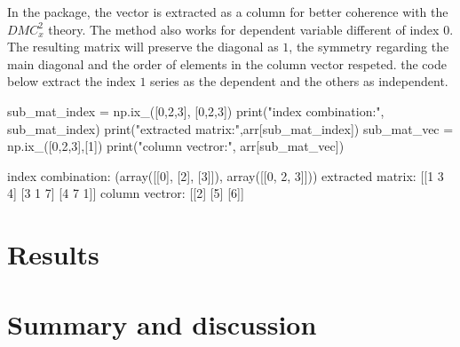 \documentclass[article]{jss}
\begin{document}
In the  package, the vector is extracted as a column for better coherence with the $DMC_{x}^{2}$ theory. The method also works for dependent variable different of index $0$. The resulting matrix will preserve the diagonal as $1$, the symmetry regarding the main diagonal and the order of elements in the column vector respeted. the code below extract the index $1$ series as the dependent and the others as independent.
\begin{CodeChunk}
\begin{CodeInput}
sub_mat_index = np.ix_([0,2,3], [0,2,3])
print("index combination:\n", sub_mat_index)
print("extracted matrix:\n",arr[sub_mat_index])
sub_mat_vec = np.ix_([0,2,3],[1])
print("column vectror:\n", arr[sub_mat_vec])
\end{CodeInput}

\begin{CodeOutput}
index combination:
(array([[0],
      [2],
      [3]]), array([[0, 2, 3]]))
extracted matrix:
[[1 3 4]
[3 1 7]
[4 7 1]]
column vectror:
[[2]
[5]
[6]]
\end{CodeOutput}
\end{CodeChunk}





 


\section{Results} \label{sec:results}





\section{Summary and discussion} \label{sec:summary}
\end{document}
